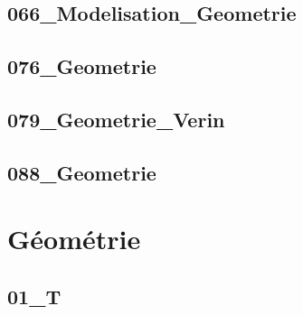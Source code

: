 \subsection{066\_Modelisation\_Geometrie}
\graphicspath{{../02-Modélisation des mécanismes/TD/Geometrie/066_Modelisation_Geometrie/images/}{../02-Modélisation des mécanismes/TD/Geometrie/066_Modelisation_Geometrie/}{../Style/png/}}


\subsection{076\_Geometrie}
\graphicspath{{../02-Modélisation des mécanismes/TD/Geometrie/076_Geometrie/images/}{../02-Modélisation des mécanismes/TD/Geometrie/076_Geometrie/}{../Style/png/}}


\subsection{079\_Geometrie\_Verin}
\graphicspath{{../02-Modélisation des mécanismes/TD/Geometrie/079_Geometrie_Verin/images/}{../02-Modélisation des mécanismes/TD/Geometrie/079_Geometrie_Verin/}{../Style/png/}}


\subsection{088\_Geometrie}
\graphicspath{{../02-Modélisation des mécanismes/TD/Geometrie/088_Geometrie/images/}{../02-Modélisation des mécanismes/TD/Geometrie/088_Geometrie/}{../Style/png/}}


\section{Géométrie}

\subsection{01\_T}
\graphicspath{{../02-Modélisation des mécanismes/TD/Géométrie/01_T/images/}{../02-Modélisation des mécanismes/TD/Géométrie/01_T/}{../Style/png/}}


